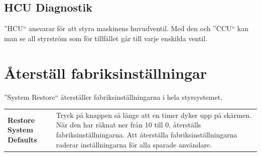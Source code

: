 \documentclass[12pt,a4paper,finnish]{uvmanual}
\begin{document}
\FloatBarrier
\subsection{HCU Diagnostik}\label{ch:system_diagnostics_ecu}


''HCU`` ansvarar för att styra maskinens huvudventil. Med den och ''CCU`` kan man se all styrström som för tillfället går till varje enskilda ventil.



\section{Återställ fabriksinställningar}\label{ch:system_restore}

''System Restore`` återställer fabriksinställningarna i hela styrsystemet.


\begin{tabular}{ L{0.2\textwidth} L{0.66\textwidth} }
\textbf{Restore System Defaults} & Tryck på knappen så länge att en timer dyker upp på skärmen. När den har räknat ner från 10 till 0, återställs fabriksinställningarna. Att återställa fabriksinställningarna raderar inställningarna för alla sparade användare.  \\
\end{tabular}
\end{document}
